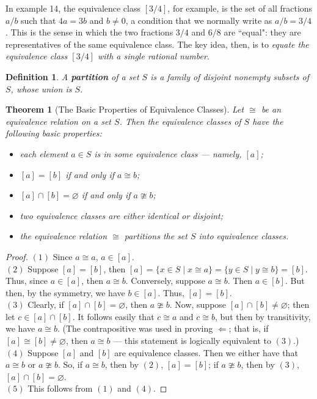 \documentclass[12pt,reqno]{amsart}
\theoremstyle{plain}
\newtheorem{defi}{Definition}
\newtheorem{theorem}{Theorem}
\begin{document}
In example 14, the equivalence class $[3/4]$, for example, is the set of all fractions $a/b$ such that $4a = 3b$ and $b \neq 0$, a condition that we normally write as $a/b = 3/4$. This is the sense in which the two fractions $3/4$ and $6/8$ are ``equal": they are representatives of the same equivalence class. The key idea, then, is to \textit{equate the equivalence class $[3/4]$ with a single rational number}.

\begin{defi} A \textbf{partition} of a set $S$ is a family of disjoint nonempty subsets of $S$, whose union is $S$.
\end{defi}
\begin{theorem}[The Basic Properties of Equivalence Classes] 
Let $\cong$ be an equivalence relation on a set $S$. Then the equivalence classes of $S$ have the following basic properties:
\begin{itemize}
\item[$1.$] each element $a \in S$ is in some equivalence class — namely, $[a]$;
\item[$2.$] $[a] = [b]$ if and only if $a \cong b$;
\item[$3.$] $[a] \cap [b] = \varnothing$ if and only if $ a \ncong b$;
\item[$4.$] two equivalence classes are either identical or disjoint;
\item[$5.$] the equivalence relation $\cong$ partitions the set $S$ into equivalence classes.
\end{itemize}
\end{theorem}
\begin{proof} $(1)$ Since $a \cong a$, $a \in [a]$.  \\
$(2)$ Suppose $[a] = [b]$, then $[a] = \{ x \in S \mid x \cong a \} = \{ y \in S \mid y \cong b \} = [b]$. Thus, since $a \in [a]$, then $a \cong b$. Conversely, suppose $a \cong b$. Then $a \in [b]$. But then, by the symmetry, we have $b \in [a]$. Thus, $[a] = [b]$. \\
$(3)$ Clearly, if $[a] \cap [b] = \varnothing$, then $a \ncong b$. Now, suppose $[a] \cap [b] \neq \varnothing$; then let $c \in [a] \cap [b]$. It follows easily that $c \cong a$ and $ c \cong b$, but then by transitivity, we have $a \cong b$.  (The contrapositive was used in proving $\Leftarrow$; that is, if $[a] \cong [b] \neq \varnothing$, then $a \cong b$ — this statement is logically equivalent to $(3)$.) \\
$(4)$ Suppose $[a]$ and $[b]$ are equivalence classes. Then we either have that $a \cong b$ or $a \ncong b$. So, if $a \cong b$, then by $(2)$, $[a]=[b]$; if $a \ncong b$, then by $(3)$, $[a] \cap [b] = \varnothing$. \\
$(5)$ This follows from $(1)$ and $(4)$. 
\end{proof}
\end{document}
